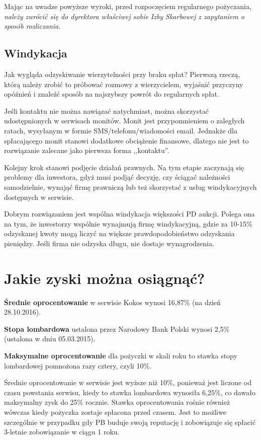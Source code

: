 \documentclass[a4paper,twoside,titlepage,openright]{book}
\begin{document}
Mając na uwadze powyższe wyroki, przed rozpoczęciem regularnego pożyczania, \emph{należy zwrócić się do dyrektora właściwej sobie Izby Skarbowej z zapytaniem o sposób rozliczania.} \cite{oswiadczenieKokos}

\subsection*{Windykacja}

Jak wygląda odzyskiwanie wierzytelności przy braku spłat? Pierwszą rzeczą, którą należy zrobić to próbować rozmowy z wierzycielem, wyjaśnić przyczyny opóźnień i znaleźć sposób na najszybszy powrót do regularnych spłat. 

Jeśli kontaktu nie można nawiązać natychmiast, można skorzystać udostępnionych w serwisach monitów. Monit jest przypomnieniem o zaległych ratach, wysyłanym w formie SMS/telefonu/wiadomości email. Jednakże dla spłacającego monit stanowi dodatkowe obciążenie finansowe, dlatego nie jest to rozwiązanie zalecane jako pierwsza forma ,,kontaktu''. 

Kolejny krok stanowi podjęcie działań prawnych. Na tym etapie zaczynają się problemy dla inwestora, gdyż musi podjąć decyzję, czy ściągać należności samodzielnie, wynająć firmę prawniczą lub też skorzystać z usług windykacyjnych dostępnych w serwisie. 

Dobrym rozwiązaniem jest wspólna windykacja większości PD aukcji. Polega ona na tym, że inwestorzy wspólnie wynajmują firmę windykacyjną, gdzie za 10-15\% odzyskanej kwoty mogą liczyć na większe prawdopodobieństwo odzyskania pieniędzy. Jeśli firma nie odzyska długu, nie dostaje wynagrodzenia.


\section{Jakie zyski można osiągnąć?}

\textbf{Średnie oprocentowanie} w serwisie Kokos wynosi 16,87\% \cite{zostanInwestorem} (na dzień 28.10.2016).

\textbf{Stopa lombardowa} ustalona przez Narodowy Bank Polski wynosi 2,5\% \cite{stopy} (ustalona w dniu 05.03.2015).
 
\textbf{Maksymalne oprocentowanie} dla pożyczki w skali roku to stawka stopy lombardowej pomnożona razy cztery, czyli 10\%.

Średnie oprocentowanie w serwisie jest wyższe niż 10\%, ponieważ jest liczone od czasu powstania serwisu, kiedy to stawka lombardowa wynosiła 6,25\%, co dawało maksymalny zysk do 25\% rocznie. Stawka oprocentowania rośnie również wówczas kiedy pożyczka zostaje spłacona przed czasem. Jest to możliwe szczególnie w przypadku gdy PB buduje swoją reputację i zobowiązuje się spłacić 3-letnie zobowiązanie w ciągu 1 roku. 
\end{document}
